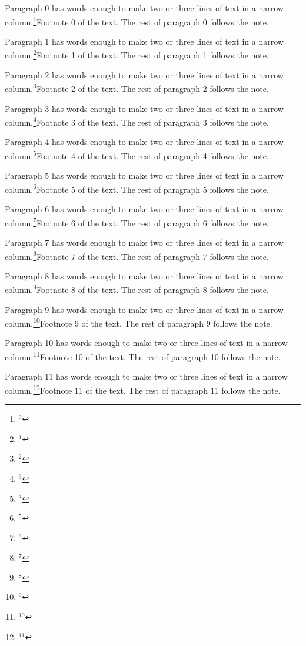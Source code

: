 \vsize=150pt \maxdepth=2pt \hsize=200pt \parindent=0pt
Paragraph 0 has words enough to make two or three lines of text in a narrow column.\footnote{$^{0}$}{Footnote 0 of the text.} The rest of paragraph 0 follows the note.\par
Paragraph 1 has words enough to make two or three lines of text in a narrow column.\footnote{$^{1}$}{Footnote 1 of the text.} The rest of paragraph 1 follows the note.\par
Paragraph 2 has words enough to make two or three lines of text in a narrow column.\footnote{$^{2}$}{Footnote 2 of the text.} The rest of paragraph 2 follows the note.\par
Paragraph 3 has words enough to make two or three lines of text in a narrow column.\footnote{$^{3}$}{Footnote 3 of the text.} The rest of paragraph 3 follows the note.\par
Paragraph 4 has words enough to make two or three lines of text in a narrow column.\footnote{$^{4}$}{Footnote 4 of the text.} The rest of paragraph 4 follows the note.\par
Paragraph 5 has words enough to make two or three lines of text in a narrow column.\footnote{$^{5}$}{Footnote 5 of the text.} The rest of paragraph 5 follows the note.\par
Paragraph 6 has words enough to make two or three lines of text in a narrow column.\footnote{$^{6}$}{Footnote 6 of the text.} The rest of paragraph 6 follows the note.\par
Paragraph 7 has words enough to make two or three lines of text in a narrow column.\footnote{$^{7}$}{Footnote 7 of the text.} The rest of paragraph 7 follows the note.\par
Paragraph 8 has words enough to make two or three lines of text in a narrow column.\footnote{$^{8}$}{Footnote 8 of the text.} The rest of paragraph 8 follows the note.\par
Paragraph 9 has words enough to make two or three lines of text in a narrow column.\footnote{$^{9}$}{Footnote 9 of the text.} The rest of paragraph 9 follows the note.\par
Paragraph 10 has words enough to make two or three lines of text in a narrow column.\footnote{$^{10}$}{Footnote 10 of the text.} The rest of paragraph 10 follows the note.\par
Paragraph 11 has words enough to make two or three lines of text in a narrow column.\footnote{$^{11}$}{Footnote 11 of the text.} The rest of paragraph 11 follows the note.\par
